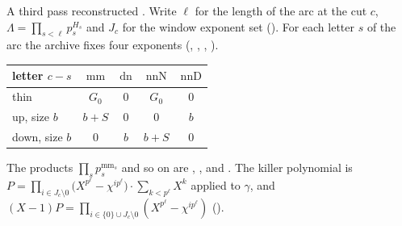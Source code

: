 \documentclass[11pt]{article}
\theoremstyle{definition}
\theoremstyle{remark}
\begin{document}
A third pass reconstructed . Write $\ell$ for the length of the arc at the cut $c$, $\Lambda=\prod_{s<\ell}p_s^{H_s}$ and $J_c$ for the window exponent set (). For each letter $s$ of the arc the archive fixes four exponents (, , , ).
\begin{center}
\begin{tabular}{@{}lcccc@{}}
\toprule
letter $c-s$ & $\mathrm{mm}$ & $\mathrm{dn}$ & $\mathrm{nnN}$ & $\mathrm{nnD}$\\
\midrule
thin & $G_0$ & $0$ & $G_0$ & $0$\\
up, size $b$ & $b+S$ & $0$ & $0$ & $b$\\
down, size $b$ & $0$ & $b$ & $b+S$ & $0$\\
\bottomrule
\end{tabular}
\end{center}
The products $\prod_sp_s^{\mathrm{mm}_s}$ and so on are , ,  and . The killer polynomial is $P=\prod_{i\in J_c\setminus0}\bigl(X^{p^\ell}-\chi^{ip^\ell}\bigr)\cdot\sum_{k<p^\ell}X^k$ applied to $\gamma$, and $(X-1)P=\prod_{i\in\{0\}\cup J_c\setminus0}(X^{p^\ell}-\chi^{ip^\ell})$ ().
\end{document}
